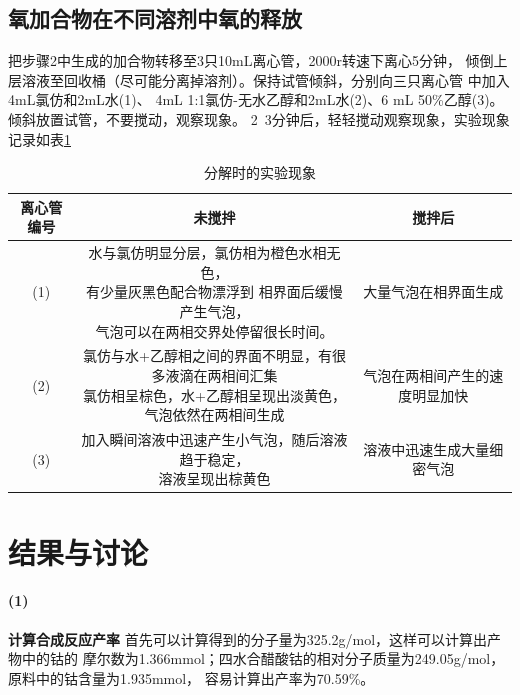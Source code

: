 \documentclass[a4paper,zihao=5,UTF8]{ctexart}
\begin{document}
    \subsection{氧加合物在不同溶剂中氧的释放}
    把步骤2中生成的加合物转移至3只10mL离心管，2000r转速下离心5分钟，
    倾倒上层溶液至回收桶（尽可能分离掉溶剂）。保持试管倾斜，分别向三只离心管
    中加入4mL氯仿和2mL水(1)、
    4mL 1:1氯仿-无水乙醇和2mL水(2)、6 mL 50\%乙醇(3)。倾斜放置试管，不要搅动，观察现象。
    2~3分钟后，轻轻搅动观察现象，实验现象记录如表\ref{fenjieshiyanxianxiang}
    \begin{table}[htbp]
        \centering
        \caption{分解时的实验现象}
        \label{fenjieshiyanxianxiang}
        \begin{tabular}[htbp]{ccc}
            \toprule
            离心管编号 & 未搅拌 & 搅拌后 \\
            \midrule
            (1) & \makecell[c]{水与氯仿明显分层，氯仿相为橙色水相无色，\\有少量灰黑色配合物漂浮到
            相界面后缓慢产生气泡，\\气泡可以在两相交界处停留很长时间。}& 大量气泡在相界面生成\\
            (2) & \makecell[c]{氯仿与水+乙醇相之间的界面不明显，有很多液滴在两相间汇集\\
            氯仿相呈棕色，水+乙醇相呈现出淡黄色，\\气泡依然在两相间生成} & 气泡在两相间产生的速度明显加快\\
            (3) & \makecell[c]{加入瞬间溶液中迅速产生小气泡，随后溶液趋于稳定，\\ 
            溶液呈现出棕黄色} & 溶液中迅速生成大量细密气泡\\
            \bottomrule
        \end{tabular}
    \end{table}
    \section{结果与讨论}
    \paragraph{(1)}\textbf{计算合成反应产率}
    首先可以计算得到的分子量为325.2g/mol，这样可以计算出产物中的钴的
    摩尔数为1.366mmol；四水合醋酸钴的相对分子质量为249.05g/mol，原料中的钴含量为1.935mmol，
    容易计算出产率为70.59\%。
\end{document}
